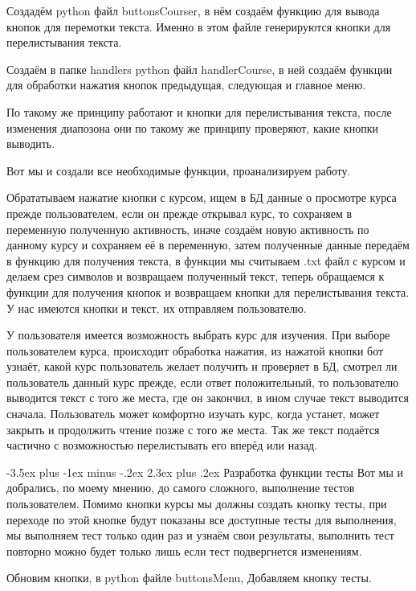 \documentclass[12pt, oldlfont, amsfonts]{report}
\makeatletter
\renewcommand{\section}{\@startsection{section}{1}{0pt}%
                                {-3.5ex plus -1ex minus -.2ex}%
                                {2.3ex plus .2ex}%
{\centering\hyphenpenalty=10000\normalfont\Large\bfseries}}
\makeatother
\begin{document}
Создадём python файл { buttonsCourser}, в нём создаём функцию для вывода кнопок для перемотки текста. Именно в этом файле генерируются кнопки для перелистывания текста.

Создаём в папке { handlers} python файл {handlerCourse}, в ней создаём функции для обработки нажатия кнопок  { предыдущая}, { следующая} и { главное меню}.

По такому же принципу работают и кнопки для перелистывания текста, после изменения диапозона они по такому же принципу проверяют, какие кнопки выводить.

Вот мы и создали все необходимые функции, проанализируем работу.

Обрататываем нажатие кнопки с курсом, ищем в БД данные о просмотре курса прежде пользователем, если он прежде открывал курс, то сохраняем в переменную полученную активность, иначе создаём новую активность по данному курсу и сохраняем её в переменную, затем полученные данные передаём в функцию для получения текста, в функции мы считываем .txt файл с курсом и делаем срез символов и возвращаем полученный текст, теперь обращаемся к функции для получения кнопок и возвращаем кнопки для перелистывания текста.
У нас имеются кнопки и текст, их отправляем пользователю.



У пользователя имеется возможность выбрать курс для изучения. При выборе пользователем курса, происходит обработка нажатия, из нажатой кнопки бот узнаёт, какой курс пользователь желает получить и проверяет в БД, смотрел ли пользователь данный курс прежде, если ответ положительный, то пользователю выводится текст с того же места, где он закончил, в ином случае текст выводится сначала. Пользователь может комфортно изучать курс, когда устанет, может закрыть и продолжить чтение позже с того же места. Так же текст подаётся частично с возможностью перелистывать его вперёд или назад.

\section{Разработка функции тесты}
Вот мы и добрались, по моему мнению, до самого сложного, выполнение тестов пользователем. Помимо кнопки курсы мы должны создать кнопку тесты, при переходе по этой кнопке будут показаны все доступные тесты для выполнения, мы выполняем тест только один раз и узнаём свои результаты, выполнить тест повторно можно будет только лишь если тест подвергнется изменениям.

Обновим кнопки, в python файле { buttonsMenu}, Добавляем кнопку { тесты}.
\end{document}
